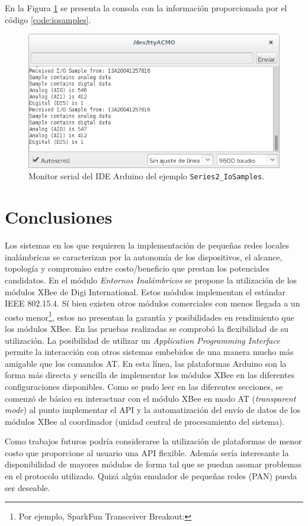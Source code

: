 \documentclass[11pt,oneside,spanish,a4paper]{article}
\begin{document}
En la Figura \ref{fig:iosamples} se presenta la consola con la
información proporcionada por el código \ref{code:iosamples}. 
\begin{figure}[h]
  \centering
  \includegraphics[width=.5\textwidth]{img/iosamples-consola}
  \caption{Monitor serial del IDE Arduino del ejemplo
    \texttt{Series2\_IoSamples}.}
  \label{fig:iosamples}
\end{figure}

\section{Conclusiones}
\label{sec:conc}

Los sistemas en los que requieren la implementación de pequeñas redes
locales inalámbricas se caracterizan por la autonomía de los
dispositivos, el alcance, topología y compromiso entre costo/beneficio
que prestan los potenciales candidatos. En el módulo \emph{Entornos
  Inalámbricos} se propone la utilización de los módulos XBee de Digi
International. Estos módulos implementan el estándar IEEE 802.15.4. Sí
bien existen otros módulos comerciales con menos llegada a un costo
menor\footnote{Por ejemplo, SparkFun Transceiver Breakout:
  }, estos no presentan la
garantía y posibilidades en rendimiento que los módulos XBee. En las
pruebas realizadas se comprobó la flexibilidad de su utilización. La
posibilidad de utilizar un \emph{Application Programming Interface}
permite la interacción con otros sistemas embebidos de una manera
mucho más amigable que los comandos AT. En esta línea, las plataformas
Arduino son la forma más directa y sencilla de implementar los módulos
XBee en las diferentes configuraciones disponibles. Como se pudo
leer en las diferentes secciones, se comenzó de básico en interactuar
con el módulo XBee en modo AT (\textsl{transparent mode}) al punto
implementar el API y la automatización del envío de datos de los
módulos XBee al coordinador (unidad central de procesamiento del
sistema). 

Como trabajos futuros podría considerarse la utilización de
plataformas de menor costo que proporcione al usuario una API
flexible. Además sería interesante la disponibilidad de mayores
módulos de forma tal que se puedan asomar problemas en el protocolo
utilizado. Quizá algún emulador de pequeñas redes (PAN) pueda ser
deseable.
\end{document}
